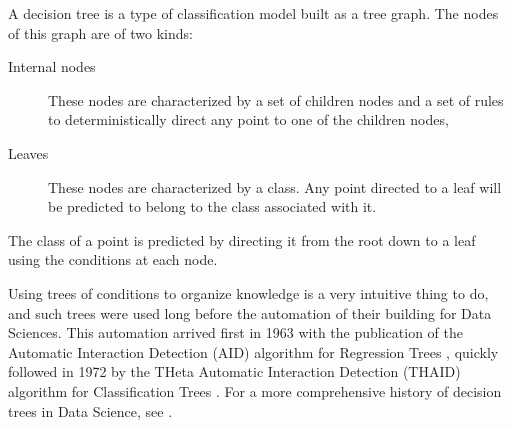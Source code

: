 \begin{definition}
    A decision tree is a type of classification model built as a tree graph. The nodes of this graph are of two kinds:
    \begin{description}
        \item[Internal nodes] These nodes are characterized by a set of children nodes and a set of rules to deterministically direct any point to one of the children nodes,
        \item[Leaves] These nodes are characterized by a class. Any point directed to a leaf will be predicted to belong to the class associated with it.
    \end{description}
    The class of a point is predicted by directing it from the root down to a leaf using the conditions at each node.
\end{definition}




Using trees of conditions to organize knowledge is a very intuitive thing to do, and such trees were used long before the automation of their building for Data Sciences. This automation arrived first in 1963 with the publication of the Automatic Interaction Detection (AID) algorithm for Regression Trees \cite{morgan1963_first_reg_tree}, quickly followed in 1972 by the THeta Automatic Interaction Detection (THAID) algorithm for Classification Trees \cite{Messenger1972_first_classification_tree}. For a more comprehensive history of decision trees in Data Science, see \cite{Loh2014_decision_trees_history}.

